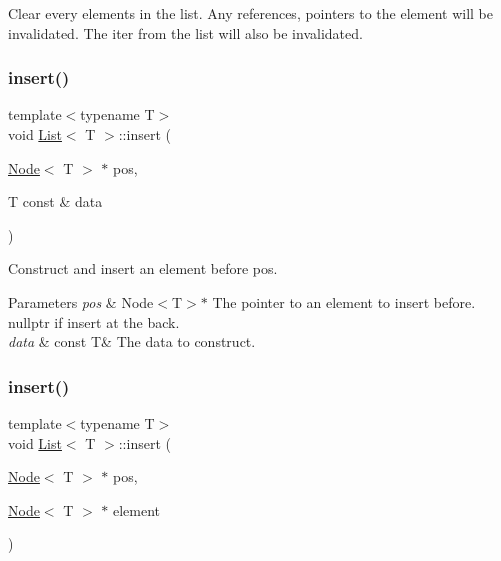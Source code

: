 Clear every elements in the list. Any references, pointers to the element will be invalidated. The {\ttfamily iter} from the list will also be invalidated. \mbox{\label{classList_af583e46c2dad89c3f29be38a52dd27bc}} 
\subsubsection{\texorpdfstring{insert()}{insert()}\hspace{0.1cm}{\footnotesize\ttfamily [1/2]}}
{\footnotesize\ttfamily template$<$typename T$>$ \\
void \hyperlink{classList}{List}$<$ T $>$\+::insert (\begin{DoxyParamCaption}\item[{\hyperlink{structNode}{Node}$<$ T $>$ $\ast$}]{pos,  }\item[{T const \&}]{data }\end{DoxyParamCaption})\hspace{0.3cm}{\ttfamily [inline]}}



Construct and insert an element before pos. 


\begin{DoxyParams}{Parameters}
{\em pos} & Node$<$\+T$>$$\ast$ The pointer to an element to insert before. nullptr if insert at the back. \\
\hline
{\em data} & const T\& The data to construct. \\
\hline
\end{DoxyParams}
\mbox{\label{classList_ac7fcefb285d5b4991be548342f9b86e9}} 
\subsubsection{\texorpdfstring{insert()}{insert()}\hspace{0.1cm}{\footnotesize\ttfamily [2/2]}}
{\footnotesize\ttfamily template$<$typename T$>$ \\
void \hyperlink{classList}{List}$<$ T $>$\+::insert (\begin{DoxyParamCaption}\item[{\hyperlink{structNode}{Node}$<$ T $>$ $\ast$}]{pos,  }\item[{\hyperlink{structNode}{Node}$<$ T $>$ $\ast$}]{element }\end{DoxyParamCaption})\hspace{0.3cm}{\ttfamily [inline]}}



